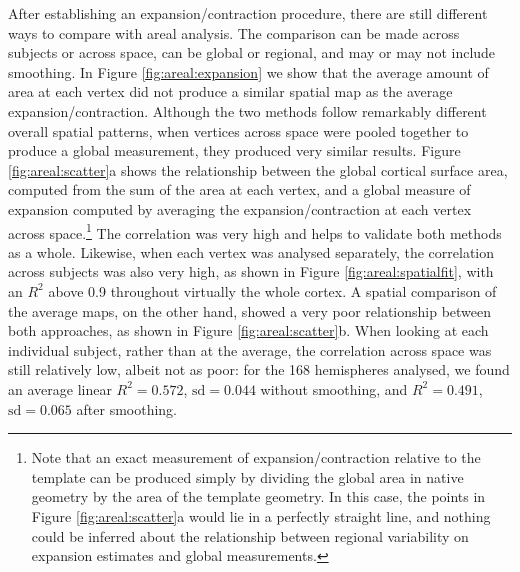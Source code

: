 After establishing an expansion/contraction procedure, there are still different ways to compare with areal analysis. The comparison can be made across subjects or across space, can be global or regional, and may or may not include smoothing. In Figure \ref{fig:areal:expansion} we show that the average amount of area at each vertex did not produce a similar spatial map as the average expansion/contraction. Although the two methods follow remarkably different overall spatial patterns, when vertices across space were pooled together to produce a global measurement, they produced very similar results. Figure \ref{fig:areal:scatter}a shows the relationship between the global cortical surface area, computed from the sum of the area at each vertex, and a global measure of expansion computed by averaging the expansion/contraction at each vertex across space.\footnote{Note that an exact measurement of expansion/contraction relative to the template can be produced simply by dividing the global area in native geometry by the area of the template geometry. In this case, the points in Figure \ref{fig:areal:scatter}a would lie in a perfectly straight line, and nothing could be inferred about the relationship between regional variability on expansion estimates and global measurements.} The correlation was very high and helps to validate both methods as a whole. Likewise, when each vertex was analysed separately, the correlation across subjects was also very high, as shown in Figure \ref{fig:areal:spatialfit}, with an $R^2$ above 0.9 throughout virtually the whole cortex. A spatial comparison of the average maps, on the other hand, showed a very poor relationship between both approaches, as shown in Figure \ref{fig:areal:scatter}b. When looking at each individual subject, rather than at the average, the correlation across space was still relatively low, albeit not as poor: for the 168 hemispheres analysed, we found an average linear $R^2=0.572$, $\text{sd}=0.044$ without smoothing, and $R^2=0.491$, $\text{sd}=0.065$ after smoothing.

